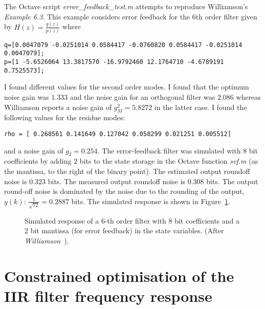 \documentclass[a4paper,twoside,10pt,english]{report}
\begin{document}
The Octave script \emph{error\_feedback\_test.m}
attempts to reproduce Williamson's 
\emph{Example 6.3}. This example considers error feedback for the $6$th order
filter given by $H\left(z\right)=\frac{q\left(z\right)}{p\left(z\right)}$ where
\begin{small}
\begin{verbatim}
q=[0.0047079 -0.0251014 0.0584417 -0.0760820 0.0584417 -0.0251014 0.0047079];
p=[1 -5.6526064 13.3817570 -16.9792460 12.1764710 -4.6789191 0.7525573];
\end{verbatim}
\end{small}
I found different values for the second order modes. I found that the optimum
noise gain was $1.333$ and the noise gain for an orthogonal filter was $2.086$
whereas Williamson reports a noise gain of $g_{M}^{2}=5.8272$ in the latter case.
I found the following values for the residue modes:
\begin{small}
\begin{verbatim}
rho = [ 0.268561 0.141649 0.127042 0.058299 0.021251 0.005512]
\end{verbatim}
\end{small}
and a noise gain of $g_{I}=0.254$. The error-feedback filter was simulated with
8 bit coefficients by adding $2$ bits to the state storage in the Octave 
function \emph{svf.m} (as the mantissa, to the right of the binary point). The
estimated output roundoff noise is $0.323$ bits. The measured output roundoff
noise is $0.308$ bits. The output round-off noise is dominated by the noise due
to the rounding of the output, $y\left(k\right)$: $\frac{1}{\sqrt{12}}=0.2887$
bits. The simulated response is shown in 
Figure~\ref{fig:Simulated-response-of-6th-order-filter-with-error-feedback}.
\begin{figure}[!htbp]
\centering
\scalebox{0.7}{}
\caption{Simulated response of a 6-th order filter with 8 bit coefficients and
a 2 bit mantissa (for error feedback) in the state variables. (After 
\emph{Williamson}~\cite[Example 6.3]
{Williamson_RoundoffNoiseMinimizationUsingResidueFeedback}).}
\label{fig:Simulated-response-of-6th-order-filter-with-error-feedback}
\end{figure}
\cleardoublepage{}
\part{\label{sec:Constrained-Optimisation-of-IIR-frequency-response}Constrained optimisation of the IIR filter frequency response}
\cleardoublepage{}
\end{document}
